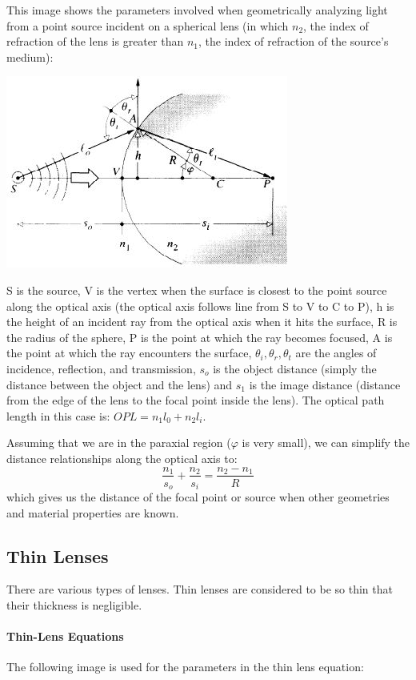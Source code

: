 \documentclass[12pt]{report}
\begin{document}
This image shows the parameters involved when geometrically analyzing light from a point source incident on a spherical lens (in which $n_2$, the index of refraction of the lens is greater than $n_1$, the index of refraction of the source's medium): 

\includegraphics[scale=.75]{SphericalLens1.jpg}

S is the source, V is the vertex when the surface is closest to the point source along the optical axis (the optical axis follows line from S to V to C to P), h is the height of an incident ray from the optical axis when it hits the surface, R is the radius of the sphere, P is the point at which the ray becomes focused, A is the point at which the ray encounters the surface, $\theta_i, \theta_r, \theta_t$ are the angles of incidence, reflection, and transmission, $s_o$ is the object distance (simply the distance between the object and the lens) and $s_1$ is the image distance (distance from the edge of the lens to the focal point inside the lens). The optical path length in this case is: $OPL = n_1 l_0 + n_2 l_i$. 

Assuming that we are in the paraxial region ($\varphi$ is very small), we can simplify the distance relationships along the optical axis to: \[\frac{n_1}{s_o}+\frac{n_2}{s_i}=\frac{n_2-n_1}{R} \] which gives us the distance of the focal point or source when other geometries and material properties are known. 

\subsection{Thin Lenses}
There are various types of lenses. Thin lenses are considered to be so thin that their thickness is negligible.

\paragraph{Thin-Lens Equations}
The following image is used for the parameters in the thin lens equation: 
\end{document}
